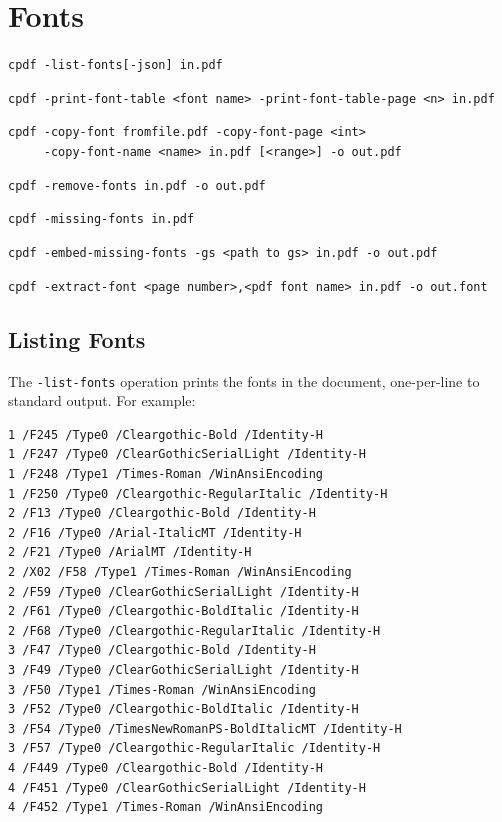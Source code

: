 \documentclass{book}
\begin{document}
\chapter{Fonts}\pagestyle{fancy}\label{chap:14}
 {\small \begin{framed}

  \small\noindent\verb!cpdf -list-fonts[-json] in.pdf!

  \vspace{1.5mm}
  \noindent\verb!cpdf -print-font-table <font name> -print-font-table-page <n> in.pdf!
  
  \vspace{1.5mm}
  \noindent\verb!cpdf -copy-font fromfile.pdf -copy-font-page <int>!\\
  \noindent\verb!     -copy-font-name <name> in.pdf [<range>] -o out.pdf!

  \vspace{1.5mm}
  \noindent\verb!cpdf -remove-fonts in.pdf -o out.pdf!

  \vspace{1.5mm}
  \noindent\verb!cpdf -missing-fonts in.pdf!

  \vspace{1.5mm}
  \noindent\verb!cpdf -embed-missing-fonts -gs <path to gs> in.pdf -o out.pdf!

  \vspace{1.5mm}
  \noindent\verb!cpdf -extract-font <page number>,<pdf font name> in.pdf -o out.font!

  \end{framed}}
 
\section{Listing Fonts}

\label{listingfonts}
  The \texttt{-list-fonts} operation prints the fonts in the document,
one-per-line to standard output. For example:
{\small\begin{framed}\small\begin{verbatim}1 /F245 /Type0 /Cleargothic-Bold /Identity-H
1 /F247 /Type0 /ClearGothicSerialLight /Identity-H
1 /F248 /Type1 /Times-Roman /WinAnsiEncoding
1 /F250 /Type0 /Cleargothic-RegularItalic /Identity-H
2 /F13 /Type0 /Cleargothic-Bold /Identity-H
2 /F16 /Type0 /Arial-ItalicMT /Identity-H
2 /F21 /Type0 /ArialMT /Identity-H
2 /X02 /F58 /Type1 /Times-Roman /WinAnsiEncoding
2 /F59 /Type0 /ClearGothicSerialLight /Identity-H
2 /F61 /Type0 /Cleargothic-BoldItalic /Identity-H
2 /F68 /Type0 /Cleargothic-RegularItalic /Identity-H
3 /F47 /Type0 /Cleargothic-Bold /Identity-H
3 /F49 /Type0 /ClearGothicSerialLight /Identity-H
3 /F50 /Type1 /Times-Roman /WinAnsiEncoding
3 /F52 /Type0 /Cleargothic-BoldItalic /Identity-H
3 /F54 /Type0 /TimesNewRomanPS-BoldItalicMT /Identity-H
3 /F57 /Type0 /Cleargothic-RegularItalic /Identity-H
4 /F449 /Type0 /Cleargothic-Bold /Identity-H
4 /F451 /Type0 /ClearGothicSerialLight /Identity-H
4 /F452 /Type1 /Times-Roman /WinAnsiEncoding
\end{verbatim}
\end{framed}}
\end{document}
